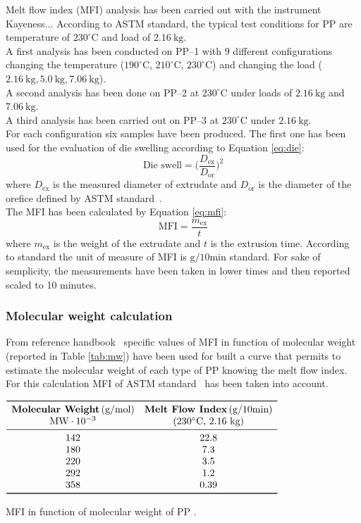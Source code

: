 \documentclass[a4paper, 11pt]{article}
\begin{document}
Melt flow index (MFI) analysis has been carried out with the instrument Kayeness... According to ASTM standard, the typical test conditions for PP are temperature of $230 ^\circ$C and load of $2.16\  \text{kg}$. \\
A first analysis has been conducted on PP–1 with 9 different configurations changing the temperature ($190 ^\circ$C, $210 ^\circ$C, $230 ^\circ$C) and changing the load ($2.16\ \text{kg}, 5.0\ \text{kg}, 7.06 \ \text{kg}$). \\
A second analysis has been done on PP–2 at $230 ^\circ$C under loads of  $2.16\ \text{kg}$ and  $7.06\ \text{kg}$. \\
A third analysis has been carried out on PP–3 at $230 ^\circ$C under $2.16\ \text{kg}$. \\
For each configuration six samples have been produced. The first one has been used for the evaluation of die swelling according to Equation \ref{eq:die}:
\begin{equation}
\text{Die\ swell} = \bigg(\frac{D_\text{ex}}{D_\text{or}}\bigg)^2
\label{eq:die}
\end{equation}
where $D_\text{ex}$ is the measured diameter of extrudate and $D_\text{or}$ is the diameter of the orefice defined by ASTM standard~\cite{MFI}. \\
The MFI has been calculated by Equation \ref{eq:mfi}: 
\begin{equation}
\text{MFI} = \frac{m_\text{ex}}{t}
\label{eq:mfi}
\end{equation}
where $m_\text{ex}$ is the weight of the extrudate and $t$ is the extrusion time. According to standard the unit of measure of MFI is $\text{g/10min}$ standard. For sake of semplicity, the measurements have been taken in lower times and then reported scaled to 10 minutes. 

\subsubsection{Molecular weight calculation}
From reference handbook~\cite{handbook} specific values of MFI in function of molecular weight (reported in Table \ref{tab:mw}) have been used for built a curve that permits to estimate the molecular weight of each type of PP knowing the melt flow index. For this calculation MFI of ASTM standard~\cite{MFI} has been taken into account.
\begin{table}[htp]
	\centering
	$
	\begin{array}{cc}
	\toprule
	\textbf{Molecular Weight} \, \text{(g/mol)} & \textbf{Melt Flow Index} \, \text{(g/10min)} \\
	\text{MW}\cdot 10^{-3} & (230^\circ \text{C, 2.16 kg}) \\
	\midrule
	 142 & 22.8 \\
	 180 & 7.3 \\
	 220 & 3.5 \\
	 292 & 1.2 \\
	 358 & 0.39 \\
	\bottomrule
	\end{array}
	$
	\caption{MFI in function of molecular weight of PP .}
	\label{tab:mw}
\end{table}
\end{document}
